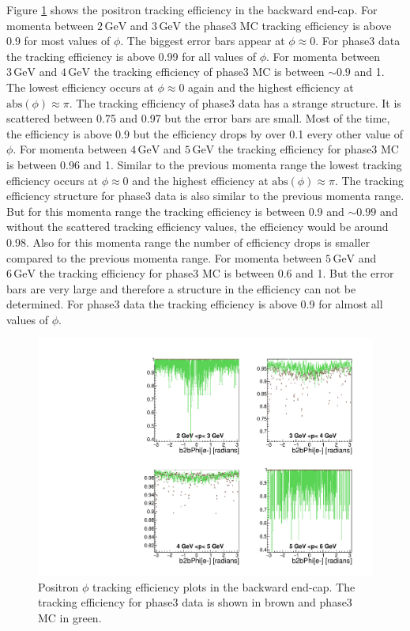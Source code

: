 \documentclass[a4paper,11pt,twosided,final,german,openbib,pdftex,listof=totoc,bibliography=totoc]{scrbook}
\begin{document}
Figure \ref{plt:xPMPhiepEC3} shows the positron tracking efficiency in the backward end-cap.
For momenta between $2\,\textrm{GeV}$ and $3\,\textrm{GeV}$ the phase3 MC tracking efficiency is above 0.9 for most values of $\phi$. The biggest error bars appear at $\phi \approx 0$. For phase3 data the tracking efficiency is above 0.99 for all values of $\phi$.
For momenta between $3\,\textrm{GeV}$ and $4\,\textrm{GeV}$ the tracking efficiency of phase3 MC is between $\sim 0.9$ and 1. The lowest efficiency occurs at $\phi \approx 0$ again and the highest efficiency at $\textrm{abs}(\phi) \approx \pi$. The tracking efficiency of phase3 data has a strange structure. It is scattered between 0.75 and 0.97 but the error bars are small. Most of the time, the efficiency is above 0.9 but the efficiency drops by over 0.1 every other value of $\phi$.
For momenta between $4\,\textrm{GeV}$ and $5\,\textrm{GeV}$ the tracking efficiency for phase3 MC is between 0.96 and 1. Similar to the previous momenta range the lowest tracking efficiency occurs at  $\phi \approx 0$ and the highest efficiency at $\textrm{abs}(\phi) \approx \pi$. The tracking efficiency structure for phase3 data is also similar to the previous momenta range. But for this momenta range the tracking efficiency is between 0.9 and $\sim 0.99$ and without the scattered tracking efficiency values, the efficiency would be around 0.98. Also for this momenta range the number of efficiency drops is smaller compared to the previous momenta range.
For momenta between $5\,\textrm{GeV}$ and $6\,\textrm{GeV}$ the tracking efficiency for phase3 MC is between 0.6 and 1. But the error bars are very large and therefore a structure in the efficiency can not be determined. For phase3 data the tracking efficiency is above 0.9 for almost all values of $\phi$.




\begin{figure}[!htbp]
	\centering
	\includegraphics[width=\textwidth]{Plots/master3/xPMPhiepECP3}
	\caption[Momentum $\phi$ Positron Backward End-Cap Efficiency Phase3]{Positron $\phi$ tracking efficiency plots in the backward end-cap. The tracking efficiency for phase3 data is shown in brown and phase3 MC in green.}
	
	\label{plt:xPMPhiepEC3}
\end{figure}
\end{document}
